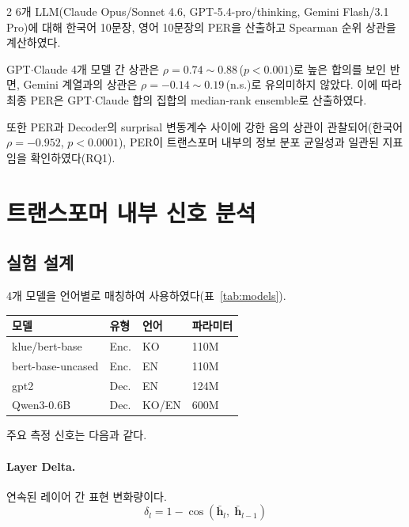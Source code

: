 \documentclass[10pt,a4paper]{article}
\begin{document}
\begin{multicols}{2}
6개 LLM(Claude Opus/Sonnet 4.6, GPT-5.4-pro/thinking, Gemini Flash/3.1 Pro)에 대해 한국어 10문장, 영어 10문장의 PER을 산출하고 Spearman 순위 상관을 계산하였다.

GPT$\cdot$Claude 4개 모델 간 상관은 $\rho{=}0.74{\sim}0.88$\,($p{<}0.001$)로 높은 합의를 보인 반면, Gemini 계열과의 상관은 $\rho{=}{-}0.14{\sim}0.19$\,(n.s.)로 유의미하지 않았다. 이에 따라 최종 PER은 GPT$\cdot$Claude 합의 집합의 median-rank ensemble로 산출하였다.

또한 PER과 Decoder의 surprisal 변동계수 사이에 강한 음의 상관이 관찰되어(한국어 $\rho{=}{-}0.952$, $p{<}0.0001$), PER이 트랜스포머 내부의 정보 분포 균일성과 일관된 지표임을 확인하였다(RQ1).

\section{트랜스포머 내부 신호 분석}

\subsection{실험 설계}

4개 모델을 언어별로 매칭하여 사용하였다(표~\ref{tab:models}).

\vspace{4pt}
\begin{center}
\label{tab:models}
\footnotesize
\begin{tabular}{@{}llll@{}}
\toprule
모델 & 유형 & 언어 & 파라미터 \\
\midrule
klue/bert-base    & Enc. & KO    & 110M \\
bert-base-uncased & Enc. & EN    & 110M \\
gpt2              & Dec. & EN    & 124M \\
Qwen3-0.6B       & Dec. & KO/EN & 600M \\
\bottomrule
\end{tabular}
\end{center}
\vspace{4pt}

주요 측정 신호는 다음과 같다.

\paragraph{Layer Delta.}
연속된 레이어 간 표현 변화량이다.
\begin{equation}
\delta_l = 1 - \cos(\bar{\mathbf{h}}_l,\;\bar{\mathbf{h}}_{l-1})
\end{equation}


\end{multicols}
\end{document}
